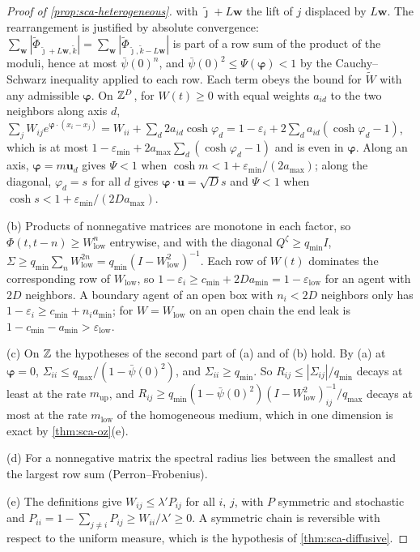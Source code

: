 \begin{proof}[Proof of \cref{prop:sca-heterogeneous}]
with $\tilde\jmath+L\mathbf w$ the lift of $j$ displaced by $L\mathbf w$. The rearrangement is justified by absolute convergence: $\sum_{\mathbf w}|\tilde\Phi_{\tilde\jmath+L\mathbf w,\tilde k}|=\sum_{\mathbf w}|\tilde\Phi_{\tilde\jmath,\tilde k-L\mathbf w}|$ is part of a row sum of the product of the moduli, hence at most $\bar\psi(0)^n$, and $\bar\psi(0)^2\le\Psi(\boldsymbol\varphi)<1$ by the Cauchy--Schwarz inequality applied to each row. Each term obeys the bound for $\tilde W$ with any admissible $\boldsymbol\varphi$. On $\mathbb{Z}^D$, for $W(t)\ge0$ with equal weights $a_{id}$ to the two neighbors along axis $d$, $\sum_jW_{ij}e^{\boldsymbol\varphi\cdot(x_i-x_j)}=W_{ii}+\sum_d2a_{id}\cosh\varphi_d=1-\varepsilon_i+2\sum_da_{id}(\cosh\varphi_d-1)$, which is at most $1-\varepsilon_{\min}+2a_{\max}\sum_d(\cosh\varphi_d-1)$ and is even in $\boldsymbol\varphi$. Along an axis, $\boldsymbol\varphi=m\mathbf u_d$ gives $\Psi<1$ when $\cosh m<1+\varepsilon_{\min}/(2a_{\max})$; along the diagonal, $\varphi_d=s$ for all $d$ gives $\boldsymbol\varphi\cdot\mathbf u=\sqrt Ds$ and $\Psi<1$ when $\cosh s<1+\varepsilon_{\min}/(2Da_{\max})$.

(b) Products of nonnegative matrices are monotone in each factor, so $\Phi(t,t-n)\ge W_{\mathrm{low}}^n$ entrywise, and with the diagonal $Q^\zeta\ge q_{\min}I$, $\Sigma\ge q_{\min}\sum_nW_{\mathrm{low}}^{2n}=q_{\min}(I-W_{\mathrm{low}}^2)^{-1}$. Each row of $W(t)$ dominates the corresponding row of $W_{\mathrm{low}}$, so $1-\varepsilon_i\ge c_{\min}+2Da_{\min}=1-\varepsilon_{\mathrm{low}}$ for an agent with $2D$ neighbors. A boundary agent of an open box with $n_i<2D$ neighbors only has $1-\varepsilon_i\ge c_{\min}+n_ia_{\min}$; for $W=W_{\mathrm{low}}$ on an open chain the end leak is $1-c_{\min}-a_{\min}>\varepsilon_{\mathrm{low}}$.

(c) On $\mathbb{Z}$ the hypotheses of the second part of (a) and of (b) hold. By (a) at $\boldsymbol\varphi=0$, $\Sigma_{ii}\le q_{\max}/(1-\bar\psi(0)^2)$, and $\Sigma_{ii}\ge q_{\min}$. So $R_{ij}\le|\Sigma_{ij}|/q_{\min}$ decays at least at the rate $m_{\mathrm{up}}$, and $R_{ij}\ge q_{\min}(1-\bar\psi(0)^2)(I-W_{\mathrm{low}}^2)^{-1}_{ij}/q_{\max}$ decays at most at the rate $m_{\mathrm{low}}$ of the homogeneous medium, which in one dimension is exact by \cref{thm:sca-oz}(e).

(d) For a nonnegative matrix the spectral radius lies between the smallest and the largest row sum (Perron--Frobenius).

(e) The definitions give $W_{ij}\le\lambda'P_{ij}$ for all $i$, $j$, with $P$ symmetric and stochastic and $P_{ii}=1-\sum_{j\neq i}P_{ij}\ge W_{ii}/\lambda'\ge0$. A symmetric chain is reversible with respect to the uniform measure, which is the hypothesis of \cref{thm:sca-diffusive}.
\end{proof}

